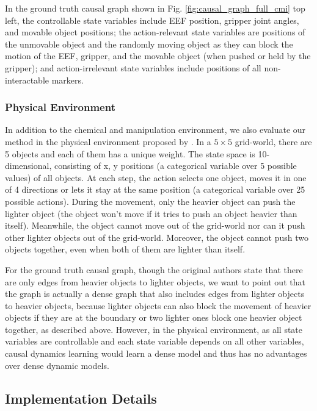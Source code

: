 In the ground truth causal graph shown in Fig. \ref{fig:causal_graph_full_cmi} top left, the controllable state variables include EEF position, gripper joint angles, and movable object positions; the action-relevant state variables are positions of the unmovable object and the randomly moving object as they can block the motion of the EEF, gripper, and the movable object (when pushed or held by the gripper); and action-irrelevant state variables include positions of all non-interactable markers.

\subsubsection{Physical Environment}

In addition to the chemical and manipulation environment, we also evaluate our method in the physical environment proposed by \cite{ke2021systematic}. In a $5 \times 5$ grid-world, there are 5 objects and each of them has a unique weight. The state space is 10-dimensional, consisting of x, y positions (a categorical variable over 5 possible values) of all objects. At each step, the action selects one object, moves it in one of 4 directions or lets it stay at the same position (a categorical variable over 25 possible actions). During the movement, only the heavier object can push the lighter object (the object won't move if it tries to push an object heavier than itself). Meanwhile, the object cannot move out of the grid-world nor can it push other lighter objects out of the grid-world. Moreover, the object cannot push two objects together, even when both of them are lighter than itself.

For the ground truth causal graph, though the original authors state that there are only edges from heavier objects to lighter objects, we want to point out that the graph is actually a dense graph that also includes edges from lighter objects to heavier objects, because lighter objects can also block the movement of heavier objects if they are at the boundary or two lighter ones block one heavier object together, as described above. However, in the physical environment, as all state variables are controllable and each state variable depends on all other variables, causal dynamics learning would learn a dense model and thus has no advantages over dense dynamic models.

\subsection{Implementation Details}

